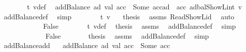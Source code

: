 \begin{isabellebody}
\ \ \ \ \ \ \isamarkupfalse%
\ t{}\ v{\isacharunderscore}{\kern0pt}def\ \isamarkupfalse%
\ {\isachardoublequoteopen}addBalance\ ad\ val\ acc\ {\isacharequal}{\kern0pt}\ Some\ {\isacharparenleft}{\kern0pt}acc{\isacharparenleft}{\kern0pt}ad\ {\isacharcolon}{\kern0pt}{\isacharequal}{\kern0pt}\ acc\ ad{\isasymlparr}bal{\isacharcolon}{\kern0pt}{\isacharequal}{\kern0pt}ShowL\isactrlsub i\isactrlsub n\isactrlsub t\ v{\isasymrparr}{\isacharparenright}{\kern0pt}{\isacharparenright}{\kern0pt}{\isachardoublequoteclose}\ \isamarkupfalse%
\ addBalance{\isacharunderscore}{\kern0pt}def\ \isamarkupfalse%
\ simp\isanewline
\ \ \ \ \ \ \isamarkupfalse%
\ t{}\ {\isacharbackquoteopen}v\ {\isasymge}{}{\isacharbackquoteclose}\ \isamarkupfalse%
\ {\isacharquery}{\kern0pt}thesis\ \isamarkupfalse%
\ assms\ Read{\isacharunderscore}{\kern0pt}ShowL{\isacharunderscore}{\kern0pt}id\ \isamarkupfalse%
\ auto\isanewline
\ \ \ \ \isamarkupfalse%
\isanewline
\ \ \ \ \ \ \isamarkupfalse%
\ False\isanewline
\ \ \ \ \ \ \isamarkupfalse%
\ t{}\ v{\isacharunderscore}{\kern0pt}def\ \isamarkupfalse%
\ {\isacharquery}{\kern0pt}thesis\ \isamarkupfalse%
\ assms{\isacharparenleft}{\kern0pt}{}{\isacharparenright}{\kern0pt}\ \isamarkupfalse%
\ addBalance{\isacharunderscore}{\kern0pt}def\ \isamarkupfalse%
\ simp\isanewline
\ \ \ \ \isamarkupfalse%
\isanewline
\ \ \isamarkupfalse%
\isanewline
\ \ \ \ \isamarkupfalse%
\ False\isanewline
\ \ \ \ \isamarkupfalse%
\ \isamarkupfalse%
\ {\isacharquery}{\kern0pt}thesis\ \isamarkupfalse%
\ assms{\isacharparenleft}{\kern0pt}{}{\isacharparenright}{\kern0pt}\ \isamarkupfalse%
\ addBalance{\isacharunderscore}{\kern0pt}def\ \isamarkupfalse%
\ simp\isanewline
\ \ \isamarkupfalse%
\isanewline
{}\isamarkupfalse%
%
\endisatagproof
{\isafoldproof}%
%
\isadelimproof
\isanewline
%
\endisadelimproof
\isanewline
{}\isamarkupfalse%
\ addBalance{\isacharunderscore}{\kern0pt}add{\isacharcolon}{\kern0pt}\isanewline
\ \ \ {\isachardoublequoteopen}addBalance\ ad\ val\ acc\ {\isacharequal}{\kern0pt}\ Some\ acc{\isacharprime}{\kern0pt}{\isachardoublequoteclose}\isanewline

\end{isabellebody}
